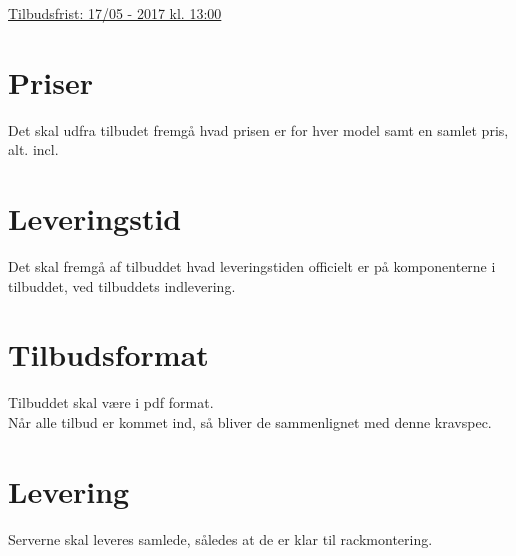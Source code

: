 



\def \overskrift    {Tilbuds kravspec}          %
\def \CompanyName   {Company} %
\def \companyName   {\CompanyName}


	\author{Heðin Ejdesgaard Møller}
	\vspace*{0mm}
	\begin{center}
		\thispagestyle{SYNACKSALEFOOTER_DK}
		\vspace*{-5mm}
	\end{center}
	
	\def \diskKapasitet		{1800} 	%
	\def \diskAntalOSDData	{20}	%
	\def \diskRatio			{5}		%
	\def \cpuGHzMulti		{2}		%
	\def \minQD				{890}	%
	\def \chkLength	{45}
	\begin{flushright}
		\underline{Tilbudsfrist: 17/05 - 2017 kl. 13:00} 
		\vspace*{-5mm}
	\end{flushright}
	
	\section*{Priser}
	Det skal udfra tilbudet fremgå hvad prisen er for hver model samt en samlet pris, alt. incl.
	
	\section*{Leveringstid}
	Det skal fremgå af tilbuddet hvad leveringstiden officielt er på komponenterne i tilbuddet, ved tilbuddets indlevering.
	
	\section*{Tilbudsformat}
	Tilbuddet skal være i pdf format. \\
	Når alle tilbud er kommet ind, så bliver de sammenlignet med denne kravspec.
	
	\section*{Levering}
	Serverne skal leveres samlede, således at de er klar til rackmontering.
	
